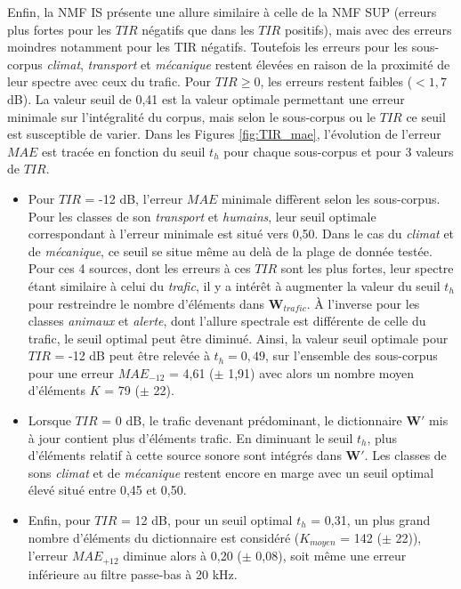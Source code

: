 Enfin, la NMF IS présente une allure similaire à celle de la NMF SUP (erreurs plus fortes pour les $TIR$ négatifs que dans les $TIR$ positifs), mais avec des erreurs moindres notamment pour les TIR négatifs. Toutefois les erreurs pour les sous-corpus \textit{climat}, \textit{transport} et \textit{mécanique} restent élevées en raison de la proximité de leur spectre avec ceux du trafic. Pour $TIR \geq 0$, les erreurs restent faibles ($< 1,7$ dB). La valeur seuil de 0,41 est la valeur optimale permettant une erreur minimale sur l'intégralité du corpus, mais selon le sous-corpus ou le $TIR$ ce seuil est susceptible de varier.
Dans les Figures \ref{fig:TIR_mae}, l'évolution de l'erreur $MAE$ est tracée en fonction du seuil $t_h$ pour chaque sous-corpus et pour 3 valeurs de $TIR$.
\begin{itemize}
\item Pour $TIR$ = -12 dB, l'erreur $MAE$ minimale diffèrent selon les sous-corpus. 
Pour les classes de son \textit{transport} et \textit{humains}, leur seuil optimale correspondant à l'erreur minimale est situé vers 0,50. Dans le cas du \textit{climat} et de \textit{mécanique}, ce seuil se situe même au delà de la plage de donnée testée.  Pour ces 4 sources, dont les erreurs à ces $TIR$ sont les plus fortes, leur spectre étant similaire à celui du \textit{trafic}, il y a intérêt à augmenter la valeur du seuil $t_h$ pour restreindre le nombre d'éléments dans $\mathbf{W}_{trafic}$. À l'inverse pour  les classes \textit{animaux} et \textit{alerte}, dont l'allure spectrale est différente de celle du trafic, le seuil optimal peut être diminué.
Ainsi, la valeur seuil optimale pour $TIR$ = -12 dB peut être relevée à $t_h = 0,49$, sur l'ensemble des sous-corpus pour une erreur $MAE_{-12}$ = 4,61 ($\pm$ 1,91) avec alors un nombre moyen d'éléments $K$ = 79 ($\pm$ 22). 
\item Lorsque $TIR$ = 0 dB, le trafic devenant prédominant, le dictionnaire $\mathbf{W'}$ mis à jour contient plus d'éléments trafic. En diminuant le seuil $t_h$, plus d'éléments relatif à cette source sonore sont intégrés dans $\mathbf{W'}$.
Les classes de sons \textit{climat} et de \textit{mécanique} restent encore en marge avec un seuil optimal élevé situé entre 0,45 et 0,50.
\item Enfin, pour $TIR$ = 12 dB, pour un seuil optimal $t_h$ = 0,31, un plus grand nombre d'éléments du dictionnaire est considéré ($K_{moyen}$ = 142 ($\pm$ 22)), l'erreur $MAE_{+12}$ diminue alors à 0,20 ($\pm$ 0,08), soit même une erreur inférieure au filtre passe-bas à 20 kHz.\\
\end{itemize}

